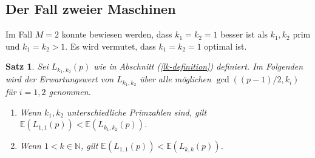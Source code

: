 \documentclass[a4paper, 10pt, ngerman]{article}
\newcommand{\E}{\mathbb{E}}
\newcommand{\N}{\mathbb{N}}
\newtheorem{theorem}{Satz}
\begin{document}
\subsection{Der Fall zweier Maschinen}

Im Fall $M = 2$ konnte bewiesen werden, dass $k_1 = k_2 = 1$ besser ist als $k_1, k_2$ prim und $k_1 = k_2 > 1$. Es wird vermutet, dass $k_1 = k_2 = 1$ optimal ist.

\begin{theorem}
    Sei $L_{k_1, k_2}(p)$ wie in Abschnitt (\ref{lk-definition}) definiert. Im Folgenden wird der Erwartungswert von $L_{k_1, k_2}$ über alle möglichen $\gcd((p - 1)/2, k_i)$ für $i = 1, 2$ genommen.
    \begin{enumerate}
        \item Wenn $k_1, k_2$ unterschiedliche Primzahlen sind, gilt $\E(L_{1, 1}(p)) < \E(L_{k_1, k_2}(p))$.
        \item Wenn $1 < k \in \N$, gilt $\E(L_{1, 1}(p)) < \E(L_{k, k}(p))$.
    \end{enumerate}
\end{theorem}
\end{document}
